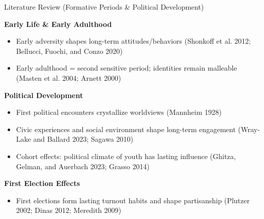 \documentclass[
  ignorenonframetext,
]{beamer}
\providecommand{\tightlist}{%
  \setlength{\itemsep}{0pt}\setlength{\parskip}{0pt}}
\begin{document}
\begin{frame}{Literature Review (Formative Periods \& Political
Development)}
\label{literature-review-formative-periods-political-development}
\small

\textbf{Early Life \& Early Adulthood}

\begin{itemize}
\tightlist
\item
  Early adversity shapes long-term attitudes/behaviors (Shonkoff et al.
  2012; Bellucci, Fuochi, and Conzo 2020)
\item
  Early adulthood = second sensitive period; identities remain malleable
  (Masten et al. 2004; Arnett 2000)
\end{itemize}

\textbf{Political Development}

\begin{itemize}
\tightlist
\item
  First political encounters crystallize worldviews (Mannheim 1928)
\item
  Civic experiences and social environment shape long-term engagement
  (Wray-Lake and Ballard 2023; Sagawa 2010)
\item
  Cohort effects: political climate of youth has lasting influence
  (Ghitza, Gelman, and Auerbach 2023; Grasso 2014)
\end{itemize}

\textbf{First Election Effects}

\begin{itemize}
\tightlist
\item
  First elections form lasting turnout habits and shape partisanship
  (Plutzer 2002; Dinas 2012; Meredith 2009)
\end{itemize}

\normalsize
\end{frame}
\end{document}
